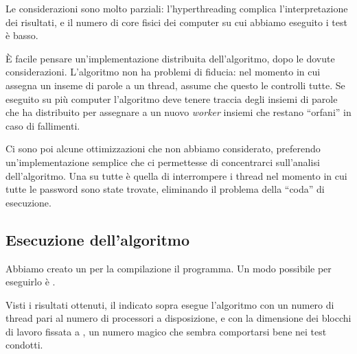 \documentclass[]{myarticle}
\begin{document}
Le considerazioni sono molto parziali: l'hyperthreading complica l'interpretazione dei risultati, e il numero di core fisici dei computer su cui abbiamo eseguito i test \`e basso.

\`E facile pensare un'implementazione distribuita dell'algoritmo, dopo le dovute considerazioni.
L'algoritmo non ha problemi di fiducia: nel momento in cui assegna un inseme di parole a un thread, assume che questo le controlli tutte.
Se eseguito su pi\`u computer l'algoritmo deve tenere traccia degli insiemi di parole che ha distribuito per assegnare a un nuovo \emph{worker} insiemi che restano ``orfani'' in caso di fallimenti.

Ci sono poi alcune ottimizzazioni che non abbiamo considerato, preferendo un'implementazione semplice che ci permettesse di concentrarci sull'analisi dell'algoritmo.
Una su tutte \`e quella di interrompere i thread nel momento in cui tutte le password sono state trovate, eliminando il problema della ``coda'' di esecuzione.

\subsection{Esecuzione dell'algoritmo}

Abbiamo creato un  per la compilazione il programma.
Un modo possibile per eseguirlo \`e .

Visti i risultati ottenuti, il  indicato sopra esegue l'algoritmo con un numero di thread pari al numero di processori a disposizione, e con la dimensione dei blocchi di lavoro fissata a , un numero magico che sembra comportarsi bene nei test condotti.

\renewcommand{\refname}{Riferimenti}

\printbibliography
\end{document}
